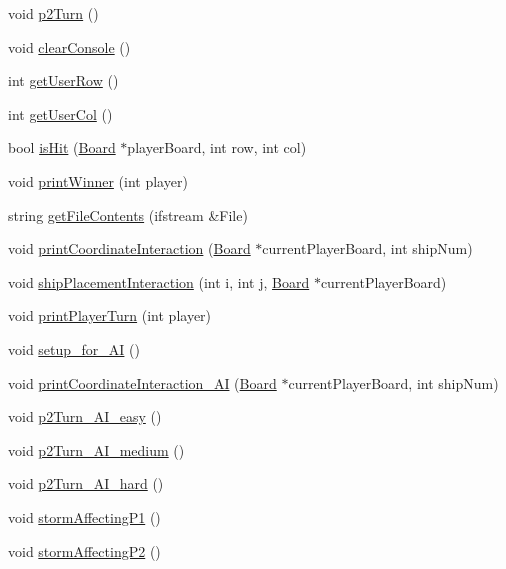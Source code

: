 \begin{DoxyCompactItemize}
void \hyperlink{classGame_a7e6bed36a3792fe78e94395de3924a2b}{p2\+Turn} ()
\item 
void \hyperlink{classGame_a9b3865147aa79dd24b2fec2dcd1326dd}{clear\+Console} ()
\item 
int \hyperlink{classGame_aa70d12c53416ed809104a7bd8274953c}{get\+User\+Row} ()
\item 
int \hyperlink{classGame_ab57a39bf1d9f48bdcc60acb5d598af22}{get\+User\+Col} ()
\item 
bool \hyperlink{classGame_a5e43c33da89e21b7a48ff2645e578a73}{is\+Hit} (\hyperlink{classBoard}{Board} $\ast$player\+Board, int row, int col)
\item 
void \hyperlink{classGame_aa8d9c78d73ff0c511c2602995e995993}{print\+Winner} (int player)
\item 
string \hyperlink{classGame_ac136d5eeb0d8aa650a0bb90a94abff46}{get\+File\+Contents} (ifstream \&File)
\item 
void \hyperlink{classGame_abd0b9e69475d3769fd4564ef1a611daf}{print\+Coordinate\+Interaction} (\hyperlink{classBoard}{Board} $\ast$current\+Player\+Board, int ship\+Num)
\item 
void \hyperlink{classGame_ac57ba0f34e5e9c3d555604e752be376b}{ship\+Placement\+Interaction} (int i, int j, \hyperlink{classBoard}{Board} $\ast$current\+Player\+Board)
\item 
void \hyperlink{classGame_afc66204a94ac13e910a4f371f9911e81}{print\+Player\+Turn} (int player)
\item 
void \hyperlink{classGame_ac80d671e53e3ed537fbf7a62d9d56f38}{setup\+\_\+for\+\_\+\+AI} ()
\item 
void \hyperlink{classGame_aa957777f94d7188d59c5bea045b1d52e}{print\+Coordinate\+Interaction\+\_\+\+AI} (\hyperlink{classBoard}{Board} $\ast$current\+Player\+Board, int ship\+Num)
\item 
void \hyperlink{classGame_ac4dac5ed617040076d0c1afbf3383857}{p2\+Turn\+\_\+\+A\+I\+\_\+easy} ()
\item 
void \hyperlink{classGame_af23dd6df0f894642f5b085fbf04615c2}{p2\+Turn\+\_\+\+A\+I\+\_\+medium} ()
\item 
void \hyperlink{classGame_a7649f2a88556628a0ff66eaf022be907}{p2\+Turn\+\_\+\+A\+I\+\_\+hard} ()
\item 
void \hyperlink{classGame_aa78cdcd5fd23c18f0791eda792624f06}{storm\+Affecting\+P1} ()
\item 
void \hyperlink{classGame_aa8be6f3ccad3ea9c05096f3aee6c3b89}{storm\+Affecting\+P2} ()
\end{DoxyCompactItemize}


